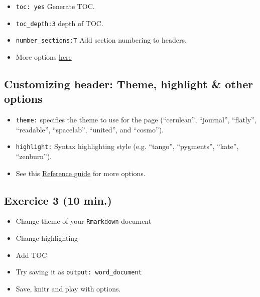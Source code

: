 \documentclass[]{article}
\providecommand{\tightlist}{%
  \setlength{\itemsep}{0pt}\setlength{\parskip}{0pt}}
\begin{document}
\begin{itemize}
\item
  \texttt{toc:\ yes} Generate TOC.
\item
  \texttt{toc\_depth:3} depth of TOC.
\item
  \texttt{number\_sections:T} Add section numbering to headers.
\item
  More options
  \href{https://bookdown.org/yihui/rmarkdown/html-document.html\#table-of-contents}{here}
\end{itemize}

\hypertarget{customizing-header-theme-highlight-other-options}{%
\subsection{Customizing header: Theme, highlight \& other
options}\label{customizing-header-theme-highlight-other-options}}

\begin{itemize}
\item
  \texttt{theme:} specifies the theme to use for the page (``cerulean'',
  ``journal'', ``flatly'', ``readable'', ``spacelab'', ``united'', and
  ``cosmo'').
\item
  \texttt{highlight:} Syntax highlighting style (e.g. ``tango'',
  ``pygments'', ``kate'', ``zenburn'').
\item
  See this
  \href{https://www.rstudio.com/wp-content/uploads/2015/03/rmarkdown-reference.pdf}{Reference
  guide} for more options.
\end{itemize}

\hypertarget{exercice-3-10-min.}{%
\subsection{Exercice 3 (10 min.)}\label{exercice-3-10-min.}}

\begin{itemize}
\tightlist
\item
  Change theme of your \texttt{Rmarkdown} document\\
\item
  Change highlighting\\
\item
  Add TOC\\
\item
  Try saving it as \texttt{output:\ word\_document}\\
\item
  Save, knitr and play with options.
\end{itemize}
\end{document}
